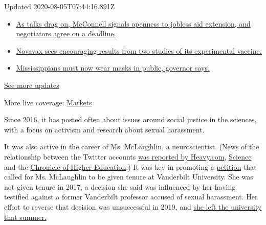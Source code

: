 Updated 2020-08-05T07:44:16.891Z

\begin{itemize}
\tightlist
\item
  \href{https://www.nytimes3xbfgragh.onion/2020/08/04/world/coronavirus-cases.html?action=click\&pgtype=Article\&state=default\&region=MAIN_CONTENT_1\&context=storylines_live_updates\#link-762df92}{As
  talks drag on, McConnell signals openness to jobless aid extension,
  and negotiators agree on a deadline.}
\item
  \href{https://www.nytimes3xbfgragh.onion/2020/08/04/world/coronavirus-cases.html?action=click\&pgtype=Article\&state=default\&region=MAIN_CONTENT_1\&context=storylines_live_updates\#link-1228a480}{Novavax
  sees encouraging results from two studies of its experimental
  vaccine.}
\item
  \href{https://www.nytimes3xbfgragh.onion/2020/08/04/world/coronavirus-cases.html?action=click\&pgtype=Article\&state=default\&region=MAIN_CONTENT_1\&context=storylines_live_updates\#link-794484ed}{Mississippians
  must now wear masks in public, governor says.}
\end{itemize}

\href{https://www.nytimes3xbfgragh.onion/2020/08/04/world/coronavirus-cases.html?action=click\&pgtype=Article\&state=default\&region=MAIN_CONTENT_1\&context=storylines_live_updates}{See
more updates}

More live coverage:
\href{https://www.nytimes3xbfgragh.onion/live/2020/08/04/business/stock-market-today-coronavirus?action=click\&pgtype=Article\&state=default\&region=MAIN_CONTENT_1\&context=storylines_live_updates}{Markets}

Since 2016, it has posted often about issues around social justice in
the sciences, with a focus on activism and research about sexual
harassment.

It was also active in the career of Ms. McLaughlin, a neuroscientist.
(News of the relationship between the Twitter accounts
\href{https://heavy.com/news/2020/08/sciencing_bi-bethann-mclaughlin-asu/}{was
reported by Heavy.com},
\href{https://www.sciencemag.org/news/2020/08/twitter-account-embattled-metoostem-founder-suspended}{Science}
and the
\href{https://www.chronicle.com/article/did-the-founder-of-metoostem-create-a-fake-online-persona-and-then-kill-it-off}{Chronicle
of Higher Education}.) It was key in promoting a
\href{https://www.change.org/p/vanderbilt-don-t-fire-prof-bethann-mclaughlin-for-standing-against-sexual-harassment}{petition}
that called for Ms. McLaughlin to be given tenure at Vanderbilt
University. She was not given tenure in 2017, a decision she said was
influenced by her having testified against a former Vanderbilt professor
accused of sexual harassment. Her effort to reverse that decision was
unsuccessful in 2019, and
\href{https://www.sciencemag.org/news/2019/07/metoostem-founder-out-vanderbilt}{she
left the university that summer.}

